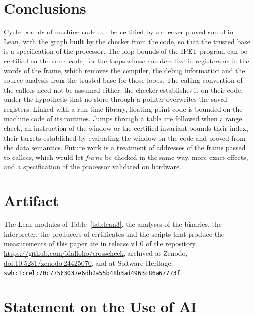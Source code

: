 \documentclass[oneside,english]{amsart}
\numberwithin{equation}{section}
\theoremstyle{plain}
\theoremstyle{definition}
\theoremstyle{plain}
\theoremstyle{plain}
\theoremstyle{remark}
\begin{document}
\section*{Conclusions}

Cycle bounds of machine code can be certified by a checker proved sound in Lean, with the graph built by the checker from the code, so that the trusted base is a specification of the processor. The loop bounds of the IPET program can be certified on the same code, for the loops whose counters live in registers or in the words of the frame, which removes the compiler, the debug information and the source analysis from the trusted base for those loops. The calling convention of the callees need not be assumed either: the checker establishes it on their code, under the hypothesis that no store through a pointer overwrites the saved registers. Linked with a run-time library, floating-point code is bounded on the machine code of its routines. Jumps through a table are followed when a range check, an instruction of the window or the certified invariant bounds their index, their targets established by evaluating the window on the code and proved from the data semantics. Future work is a treatment of addresses of the frame passed to callees, which would let \emph{frame} be checked in the same way, more exact effects, and a specification of the processor validated on hardware.

\section*{Artifact}

The Lean modules of Table~\ref{tab:lean3}, the analyses of the binaries, the interpreter, the producers of certificates and the scripts that produce the measurements of this paper are in release v1.0 of the repository \url{https://github.com/ldallolio/crosscheck}, archived at Zenodo, \href{https://doi.org/10.5281/zenodo.24425070}{doi:10.5281/zenodo.24425070}, and at Software Heritage, \href{https://archive.softwareheritage.org/swh:1:rel:70c77563037e6db2a55b48b3ad4963c86a67773f}{\nolinkurl{swh:1:rel:70c77563037e6db2a55b48b3ad4963c86a67773f}}.

\section*{Statement on the Use of AI}
\end{document}
